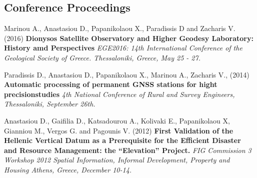 \documentclass[a4paper]{Classes/cv_prof_en} %
\begin{document}
\subsection*{Conference Proceedings}
\renewcommand*{\labelenumi}{P\theenumi.}
\begin{etaremune}
\item Marinou A., Anastasiou D., Papanikolaou X., Paradissis D and Zacharis V. (2016) \textbf{Dionysos Satellite Observatory and Higher Geodesy Laboratory: History amd Perspectives} \textit{EGE2016: 14th International Conference of the Geological Society of Greece. Thessaloniki, Greece, May 25 - 27.}
\item Paradissis D., Anastasiou D., Papanikolaou X., Marinou A., Zacharis V., (2014) \textbf{Automatic processing of permanent GNSS stations for hight precisionstudies} \textit{4th National Conference of Rural and Survey Engineers, Thessaloniki, September 26th.}
\item Anastasiou D., Gaifilia D., Katsadourou A., Kolivaki E., Papanikolaou X, Gianniou M., Vergos G. and Pagounis V. (2012) \textbf{First Validation of the Hellenic Vertical Datum as a Prerequisite for the Efficient Disaster and Resource Management: the “Elevation” Project.} \textit{FIG Commission 3 Workshop 2012 Spatial Information, Informal Development, Property and Housing Athens, Greece, December 10-14.}
\end{etaremune}
\end{document}
